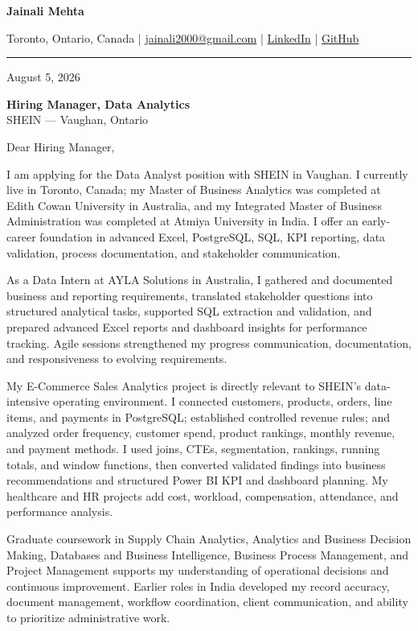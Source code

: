 \documentclass[letterpaper,10pt]{article}
\begin{document}
\begin{center}
  {\fontsize{17}{19}\selectfont\textbf{Jainali Mehta}}\par\vspace{2pt}
  \small Toronto, Ontario, Canada \;|\;
  \href{mailto:jainali2000@gmail.com}{jainali2000@gmail.com} \;|\;
  \href{https://www.linkedin.com/in/jainali-mehta}{LinkedIn} \;|\;
  \href{https://github.com/jainalimehta}{GitHub}
\end{center}
\vspace{-5pt}
\noindent\rule{\textwidth}{0.4pt}

August 5, 2026

\textbf{Hiring Manager, Data Analytics}\\
SHEIN --- Vaughan, Ontario

Dear Hiring Manager,

I am applying for the Data Analyst position with SHEIN in Vaughan. I currently live in Toronto, Canada; my Master of Business Analytics was completed at Edith Cowan University in Australia, and my Integrated Master of Business Administration was completed at Atmiya University in India. I offer an early-career foundation in advanced Excel, PostgreSQL, SQL, KPI reporting, data validation, process documentation, and stakeholder communication.

As a Data Intern at AYLA Solutions in Australia, I gathered and documented business and reporting requirements, translated stakeholder questions into structured analytical tasks, supported SQL extraction and validation, and prepared advanced Excel reports and dashboard insights for performance tracking. Agile sessions strengthened my progress communication, documentation, and responsiveness to evolving requirements.

My E-Commerce Sales Analytics project is directly relevant to SHEIN's data-intensive operating environment. I connected customers, products, orders, line items, and payments in PostgreSQL; established controlled revenue rules; and analyzed order frequency, customer spend, product rankings, monthly revenue, and payment methods. I used joins, CTEs, segmentation, rankings, running totals, and window functions, then converted validated findings into business recommendations and structured Power BI KPI and dashboard planning. My healthcare and HR projects add cost, workload, compensation, attendance, and performance analysis.

Graduate coursework in Supply Chain Analytics, Analytics and Business Decision Making, Databases and Business Intelligence, Business Process Management, and Project Management supports my understanding of operational decisions and continuous improvement. Earlier roles in India developed my record accuracy, document management, workflow coordination, client communication, and ability to prioritize administrative work.
\end{document}
